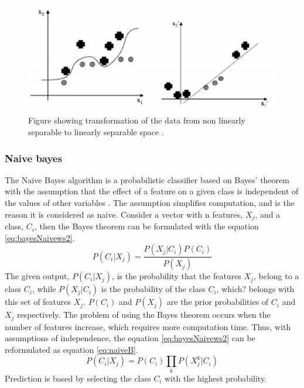 \documentclass[USenglish]{ifimaster}  %
\begin{document}
\begin{figure}[h]
	\centering
	\includegraphics{Figures/svmtransform}
	\caption{Figure showing transformation of the data from non linearly separable to linearly separable space \cite{Marsland:2009:MLA:1571643}.}
	\label{fig:svmtransform}
\end{figure}
\FloatBarrier
	
\subsubsection{Naive bayes}
The Naive Bayes algorithm is a probabilistic classifier based on Bayes’ theorem with the assumption that the effect of a feature on a given class is independent of the values of other variables \cite{Marsland:2009:MLA:1571643}. The assumption simplifies computation, and is the reason it is considered as naive. Consider a vector with n features, $X_j$, and a class, $C_i$, then the Bayes theorem can be formulated with the equation \ref{eq:bayesNaivews2}.
\begin{equation} 
P(C_i \vert X_j) = \frac{P(X_j \vert C_i)P(C_i)}{P(X_j)}
\label{eq:bayesNaivews2}
\end{equation}
The given output, $P(C_i \vert X_j)$, is the probability that the features $X_j$, belong to a class $C_i$, while $P(X_j \vert C_i)$ is the probability of the class $C_i$, which? belongs with this set of features $X_j$.  $P(C_i)$ and $P(X_j)$ are the prior probabilities of $C_i$ and  $X_j$ respectively. The problem of using the Bayes theorem occurs when the number of features increase, which requires more computation time. Thus, with assumptions of independence, the equation \ref{eq:bayesNaivews2} can be reformulated as equation \ref{eq:naiveB}.
\begin{equation} 
P(C_i \vert X_j)  = P(C_i)\prod_{k}P(X_{j}^{k} \vert C_i)
\label{eq:naiveB}
\end{equation}
Prediction is based by selecting the class $C_i$ with the highest probability.
\end{document}
